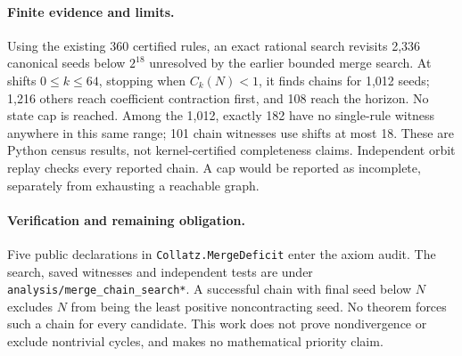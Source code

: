\documentclass[10pt]{article}
\begin{document}
\paragraph{Finite evidence and limits.}
Using the existing 360 certified rules, an exact rational search revisits
2,336 canonical seeds below $2^{18}$ unresolved by the earlier bounded
merge search. At shifts $0\leq k\leq64$, stopping when $C_k(N)<1$, it
finds chains for 1,012 seeds; 1,216 others reach coefficient contraction
first, and 108 reach the horizon. No state cap is reached. Among the
1,012, exactly 182 have no single-rule witness anywhere in this same
range; 101 chain witnesses use shifts at most 18. These are Python
census results, not kernel-certified completeness claims. Independent
orbit replay checks every reported chain. A cap would be reported as
incomplete, separately from exhausting a reachable graph.

\paragraph{Verification and remaining obligation.}
Five public declarations in \texttt{Collatz.MergeDeficit} enter the axiom
audit. The search, saved witnesses and independent tests are under
\texttt{analysis/merge\_chain\_search*}. A successful chain with final
seed below $N$ excludes $N$ from being the least positive noncontracting
seed. No theorem forces such a chain for every candidate. This work
does not prove nondivergence or exclude nontrivial cycles, and makes
no mathematical priority claim.
\end{document}
